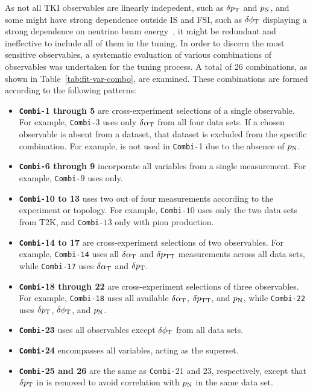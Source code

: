     As not all TKI observables are linearly indepedent, such as $\delta p_\textrm{T}$ and $p_\textrm{N}$, and some might have strong dependence outside IS and FSI, such as $\delta\phi_\textrm{T}$ displaying a strong dependence on neutrino beam energy~\cite{Lu:2015tcr}, it might be redundant and ineffective to include all of them in the tuning.
    In order to discern the most sensitive observables, a systematic evaluation of various combinations of observables was undertaken for the tuning process. 
    A total of 26 combinations, as shown in Table~\ref{tab:fit-var-combo}, are examined. 
    These combinations are formed according to the following patterns:
    \begin{itemize}
        \item \textbf{\texttt{Combi-}1 through 5} are cross-experiment selections of a single observable. 
        For example, \texttt{Combi-}$3$ uses only $\delta\alpha_\textrm{T}$ from all four data sets. 
        If a chosen observable is absent from a dataset, that dataset is excluded from the specific combination. 
        For example, \ttkzpi is not used in \texttt{Combi-}1 due to the absence of $p_\textrm{N}$.
        \item \textbf{\texttt{Combi-}6 through 9} incorporate all variables from a single measurement. For example, \texttt{Combi-}$9$ uses \minpiz only.
        \item \textbf{\texttt{Combi-}10 to 13} uses two out of four measurements according to the experiment or topology. For example, \texttt{Combi-}$10$ uses only the two data sets from T2K, and \texttt{Combi-}$13$  only with pion production. 
        \item \textbf{\texttt{Combi-}14 to 17} are cross-experiment selections of two observables. 
        For example, \texttt{Combi-14} uses all $\delta\alpha_\textrm{T}$ and $\delta p_\textrm{TT}$ measurements across all data sets, while \texttt{Combi-17} uses $\delta\alpha_\textrm{T}$ and $\delta p_\textrm{T}$.
        \item \textbf{\texttt{Combi-}18 through 22} are cross-experiment selections of three observables. 
        For example, \texttt{Combi-18} uses all available $\delta\alpha_\textrm{T}$, $\delta p_\textrm{TT}$, and $p_\textrm{N}$, while \texttt{Combi-22} uses $\delta p_\textrm{T}$, $\delta\phi_\textrm{T}$, and $p_\textrm{N}$.
        \item \textbf{\texttt{Combi-}23} uses all observables except $\delta\phi_\textrm{T}$ from all data sets.
        \item \textbf{\texttt{Combi-}24} encompasses all variables, acting as the superset.
        \item \textbf{\texttt{Combi-}25 and 26} are the same as \texttt{Combi-}$21$ and $23$, respectively, except that $\delta p_\textrm{T}$ in \minzpi is removed to avoid correlation with $p_\textrm{N}$ in the same data set.
    \end{itemize}

